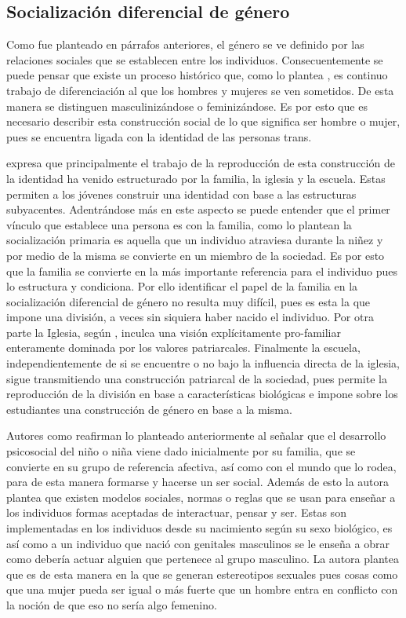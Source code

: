 \subsection{Socialización diferencial de género}

Como fue planteado en párrafos anteriores, el género se ve definido por las
relaciones sociales que se establecen entre los individuos. Consecuentemente se
puede pensar que existe un proceso histórico que, como lo plantea \textcite{Bourdieu2000},
es continuo trabajo de diferenciación al que los hombres y mujeres se ven
sometidos. De esta manera se distinguen masculinizándose o feminizándose. Es
por esto que es necesario describir esta construcción social de lo que significa
ser hombre o mujer, pues se encuentra ligada con la identidad de las
personas trans.

\textcite{Bourdieu2000} expresa que principalmente el trabajo de la reproducción
de esta construcción de la identidad ha venido estructurado por la familia, la
iglesia y la escuela. Estas permiten a los jóvenes construir una identidad con
base a las estructuras subyacentes. Adentrándose más en este aspecto se puede
entender que el primer vínculo que establece una persona es con la familia, como
lo plantean \textcite{Berger1991} la socialización primaria es aquella que un
individuo atraviesa durante la niñez y por medio de la misma se convierte en un
miembro de la sociedad. Es por esto que la familia se convierte en la más
importante referencia para el individuo pues lo estructura y condiciona. Por
ello identificar el papel de la familia en la socialización diferencial de
género no resulta muy difícil, pues es esta la que impone una división, a veces
sin siquiera haber nacido el individuo. Por otra parte la Iglesia, según
\textcite{Bourdieu2000}, inculca  una visión explícitamente pro-familiar
enteramente dominada por los valores patriarcales. Finalmente la escuela,
independientemente de si se encuentre o no bajo la influencia directa de la
iglesia, sigue transmitiendo una construcción patriarcal de la sociedad, pues
permite la reproducción de la división en base a características biológicas e
impone sobre los estudiantes una construcción de género en base a la misma.

Autores como \textcite{Mansilla1996} reafirman lo planteado anteriormente al
señalar que el desarrollo psicosocial del niño o niña viene dado inicialmente
por su familia, que se convierte en su grupo de referencia afectiva, así como
con el mundo que lo rodea, para de esta manera formarse y hacerse un ser social.
Además de esto la autora plantea que existen modelos sociales, normas o reglas
que se usan para enseñar a los individuos formas aceptadas de interactuar,
pensar y ser. Estas son implementadas en los individuos desde su nacimiento según
su sexo biológico, es así como a un individuo que nació con genitales masculinos
se le enseña a obrar como debería actuar alguien que pertenece al grupo
masculino. La autora plantea que es de esta manera en la que se generan
estereotipos sexuales pues cosas como que una mujer pueda ser igual o más
fuerte que un hombre entra en conflicto con la noción de que eso no sería algo
femenino.

